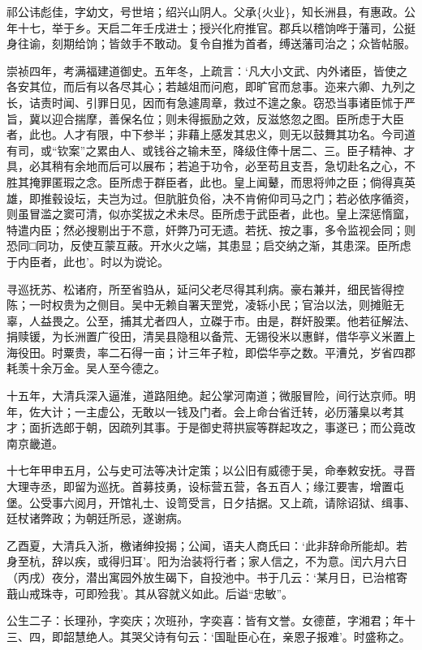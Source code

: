 \documentclass[]{article}
\begin{document}
祁公讳彪佳，字幼文，号世培；绍兴山阴人。父承\{火业\}，知长洲县，有惠政。公年十七，举于乡。天启二年壬戌进士；授兴化府推官。郡兵以稽饷哗于藩司，公挺身往谕，刻期给饷；皆敛手不敢动。复令自推为首者，缚送藩司治之；众皆帖服。

崇祯四年，考满福建道御史。五年冬，上疏言：`凡大小文武、内外诸臣，皆使之各安其位，而后有以各尽其心；若越俎而问庖，即旷官而怠事。迩来六卿、九列之长，诘责时闻、引罪日见，因而有急遽周章，救过不遑之象。窃恐当事诸臣怵于严旨，冀以迎合揣摩，善保名位；则未得振励之效，反滋悠忽之图。臣所虑于大臣者，此也。人才有限，中下参半；非藉上感发其忠义，则无以鼓舞其功名。今司道有司，或``钦案''之累由人、或钱谷之输未至，降级住俸十居二、三。臣子精神、才具，必其稍有余地而后可以展布；若追于功令，必至苟且支吾，急切赴名之心，不胜其掩罪匿瑕之念。臣所虑于群臣者，此也。皇上闻鼙，而思将帅之臣；倘得真英雄，即推毂设坛，夫岂为过。但肮脏负俗，决不肯俯仰司马之门；若必依序循资，则虽冒滥之窦可清，似亦奖拔之术未尽。臣所虑于武臣者，此也。皇上深惩惰窳，特遣内臣；然必搜剔出于不意，奸弊乃可无遗。若抚、按之事，多令监视会同；则恐同□同功，反使互蒙互蔽。开水火之端，其患显；启交纳之渐，其患深。臣所虑于内臣者，此也'。时以为谠论。

寻巡抚苏、松诸府，所至省驺从，延问父老尽得其利病。豪右兼并，细民皆得控陈；一时权贵为之侧目。吴中无赖自署天罡党，凌轹小民；官治以法，则摊赃无辜，人益畏之。公至，捕其尤者四人，立磔于市。由是，群奸股栗。他若征解法、捐赎锾，为长洲置广役田，清吴县隐租以备荒、无锡役米以惠鲜，借华亭义米置上海役田。时粟贵，率二石得一亩；计三年子粒，即偿华亭之数。平漕兑，岁省四郡耗羡十余万金。吴人至今德之。

十五年，大清兵深入逼淮，道路阻绝。起公掌河南道；微服冒险，间行达京师。明年，佐大计；一主虚公，无敢以一钱及门者。会上命台省迁转，必历藩臬以考其才；面折选郎于朝，因疏列其事。于是御史蒋拱宸等群起攻之，事遂已；而公竟改南京畿道。

十七年甲申五月，公与史可法等决计定策；以公旧有威德于吴，命奉敕安抚。寻晋大理寺丞，即留为巡抚。首募技勇，设标营五营，各五百人；缘江要害，增置屯堡。公受事六阅月，开馆礼士、设笥受言，日夕拮据。又上疏，请除诏狱、缉事、廷杖诸弊政；为朝廷所忌，遂谢病。

乙酉夏，大清兵入浙，檄诸绅投揭；公闻，语夫人商氏曰：`此非辞命所能却。若身至杭，辞以疾，或得归耳'。阳为治装将行者；家人信之，不为意。闰六月六日（丙戌）夜分，潜出寓园外放生碣下，自投池中。书于几云：`某月日，已治棺寄蕺山戒珠寺，可即殓我'。其从容就义如此。后谥``忠敏''。

公生二子：长理孙，字奕庆；次班孙，字奕喜：皆有文誉。女德茞，字湘君；年十三、四，即韶慧绝人。其哭父诗有句云：`国耻臣心在，亲恩子报难'。时盛称之。
\end{document}
